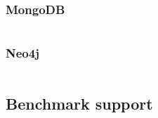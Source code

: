 \subsubsection*{MongoDB}
\inputminted[baselinestretch=1,fontsize=\footnotesize]{ruby}{app/db/seeds/mongo_db.rb}

\subsubsection*{Neo4j}
\inputminted[baselinestretch=1,fontsize=\footnotesize]{ruby}{app/db/seeds/neo4j.rb}

\clearpage{}
\subsection*{Benchmark support}
\inputminted[baselinestretch=1,fontsize=\footnotesize]{ruby}{app/spec/support/benchmark.rb}
